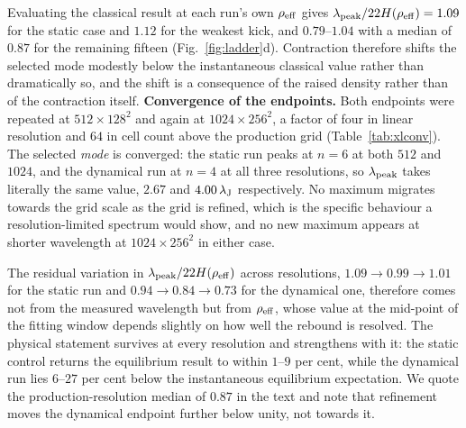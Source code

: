\documentclass[usenatbib,twoside,twocolumn]{mnras}
\begin{document}
Evaluating the classical result at each run's own $\rho_{\rm eff}$ gives $\lambda_{\rm peak}/22H(\rho_{\rm eff})=1.09$ for the static case and $1.12$ for the weakest kick, and $0.79$--$1.04$ with a median of $0.87$ for the remaining fifteen (Fig.~\ref{fig:ladder}d). Contraction therefore shifts the selected mode modestly below the instantaneous classical value rather than dramatically so, and the shift is a consequence of the raised density rather than of the contraction itself. \smallskip\noindent\textbf{Convergence of the endpoints.} Both endpoints were repeated at $512\times128^2$ and again at $1024\times256^2$, a factor of four in linear resolution and $64$ in cell count above the production grid (Table~\ref{tab:xlconv}). The selected \emph{mode} is converged: the static run peaks at $n=6$ at both $512$ and $1024$, and the dynamical run at $n=4$ at all three resolutions, so $\lambda_{\rm peak}$ takes literally the same value, $2.67$ and $4.00\,\lambda_{\rm J}$ respectively. No maximum migrates towards the grid scale as the grid is refined, which is the specific behaviour a resolution-limited spectrum would show, and no new maximum appears at shorter wavelength at $1024\times256^2$ in either case.

The residual variation in $\lambda_{\rm peak}/22H(\rho_{\rm eff})$ across resolutions, $1.09\to0.99\to1.01$ for the static run and $0.94\to0.84\to0.73$ for the dynamical one, therefore comes not from the measured wavelength but from $\rho_{\rm eff}$, whose value at the mid-point of the fitting window depends slightly on how well the rebound is resolved. The physical statement survives at every resolution and strengthens with it: the static control returns the equilibrium result to within $1$--$9$ per cent, while the dynamical run lies $6$--$27$ per cent below the instantaneous equilibrium expectation. We quote the production-resolution median of $0.87$ in the text and note that refinement moves the dynamical endpoint further below unity, not towards it.
\end{document}

